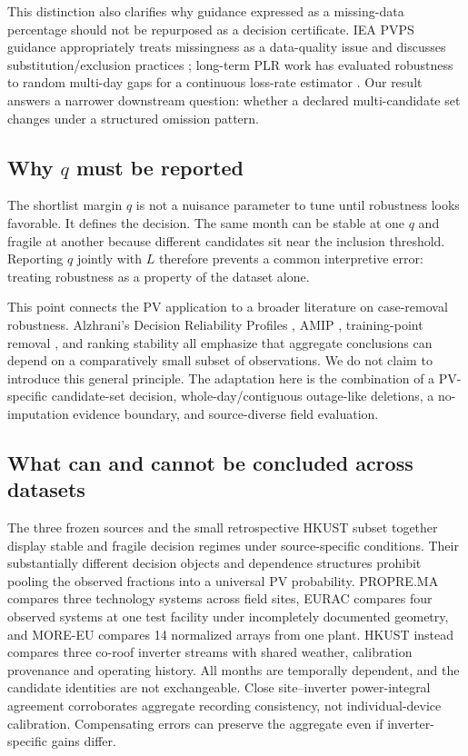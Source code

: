 \documentclass[preprint,12pt]{elsarticle}
\begin{document}
This distinction also clarifies why guidance expressed as a missing-data percentage should not be repurposed as a decision certificate. IEA PVPS guidance appropriately treats missingness as a data-quality issue and discusses substitution/exclusion practices \cite{ieapvps2024}; long-term PLR work has evaluated robustness to random multi-day gaps for a continuous loss-rate estimator \cite{quest2025}. Our result answers a narrower downstream question: whether a declared multi-candidate set changes under a structured omission pattern.

\subsection{Why $q$ must be reported}
The shortlist margin $q$ is not a nuisance parameter to tune until robustness looks favorable. It defines the decision. The same month can be stable at one $q$ and fragile at another because different candidates sit near the inclusion threshold. Reporting $q$ jointly with $L$ therefore prevents a common interpretive error: treating robustness as a property of the dataset alone.

This point connects the PV application to a broader literature on case-removal robustness. Alzhrani's Decision Reliability Profiles \cite{alzhrani2026}, AMIP \cite{giordano2026}, training-point removal \cite{yang2023}, and ranking stability \cite{liang2025} all emphasize that aggregate conclusions can depend on a comparatively small subset of observations. We do not claim to introduce this general principle. The adaptation here is the combination of a PV-specific candidate-set decision, whole-day/contiguous outage-like deletions, a no-imputation evidence boundary, and source-diverse field evaluation.

\subsection{What can and cannot be concluded across datasets}
The three frozen sources and the small retrospective HKUST subset together display stable and fragile decision regimes under source-specific conditions. Their substantially different decision objects and dependence structures prohibit pooling the observed fractions into a universal PV probability. PROPRE.MA compares three technology systems across field sites, EURAC compares four observed systems at one test facility under incompletely documented geometry, and MORE-EU compares 14 normalized arrays from one plant. HKUST instead compares three co-roof inverter streams with shared weather, calibration provenance and operating history. All months are temporally dependent, and the candidate identities are not exchangeable. Close site--inverter power-integral agreement corroborates aggregate recording consistency, not individual-device calibration. Compensating errors can preserve the aggregate even if inverter-specific gains differ.
\end{document}
